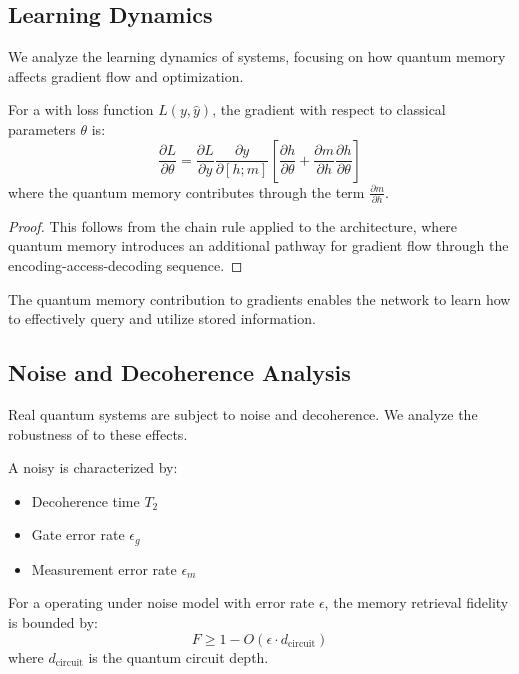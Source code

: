 \subsection{Learning Dynamics}

We analyze the learning dynamics of \qmnn systems, focusing on how quantum memory affects gradient flow and optimization.

\begin{theorem}
\label{thm:gradient_flow}
For a \qmnn with loss function $L(y, \hat{y})$, the gradient with respect to classical parameters $\theta$ is:
$$\frac{\partial L}{\partial \theta} = \frac{\partial L}{\partial y} \frac{\partial y}{\partial [h; m]} \left[ \frac{\partial h}{\partial \theta} + \frac{\partial m}{\partial h} \frac{\partial h}{\partial \theta} \right]$$
where the quantum memory contributes through the term $\frac{\partial m}{\partial h}$.
\end{theorem}

\begin{proof}
This follows from the chain rule applied to the \qmnn architecture, where quantum memory introduces an additional pathway for gradient flow through the encoding-access-decoding sequence.
\end{proof}

The quantum memory contribution to gradients enables the network to learn how to effectively query and utilize stored information.

\subsection{Noise and Decoherence Analysis}

Real quantum systems are subject to noise and decoherence. We analyze the robustness of \qmnn to these effects.

\begin{definition}
\label{def:noisy_qram}
A noisy \qram is characterized by:
\begin{itemize}
    \item Decoherence time $T_2$
    \item Gate error rate $\epsilon_g$
    \item Measurement error rate $\epsilon_m$
\end{itemize}
\end{definition}

\begin{theorem}
\label{thm:noise_resilience}
For a \qmnn operating under noise model with error rate $\epsilon$, the memory retrieval fidelity is bounded by:
$$F \geq 1 - O(\epsilon \cdot d_{\text{circuit}})$$
where $d_{\text{circuit}}$ is the quantum circuit depth.
\end{theorem}

